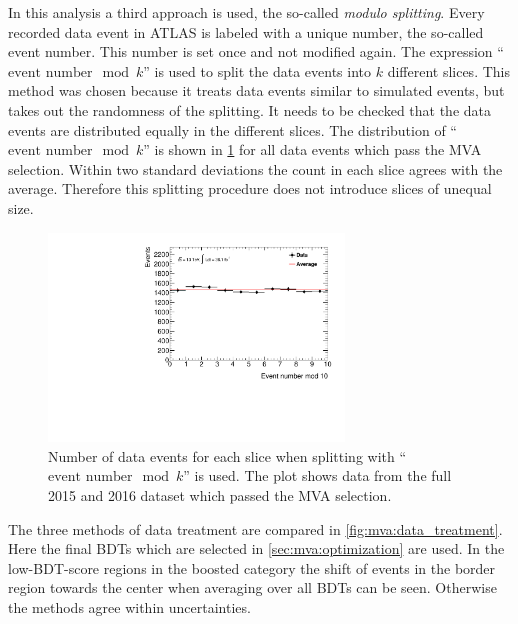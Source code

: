 In this analysis a third approach is used, the so-called \emph{modulo splitting}.
Every recorded data event in ATLAS is labeled with a unique number, the so-called event number.
This number is set once and not modified again.
The expression ``$\text{event number} \mod k$'' is used to split the data events into $k$ different slices.
This method was chosen because it treats data events similar to simulated events, but takes out the randomness of the splitting.
It needs to be checked that the data events are distributed equally in the different slices.
The distribution of ``$\text{event number} \mod k$'' is shown in \cref{fig:mva:event_number_mod} for all
data events which pass the MVA selection.
Within two standard deviations the count in each slice agrees with the average.
Therefore this splitting procedure does not introduce slices of unequal size.

\begin{figure}[htb]
    \centering
    \includegraphics[width=0.7\textwidth]{./plots/mva/data_treatment/event_number_mod.pdf}
    \caption{Number of data events for each slice when splitting with ``$\text{event number} \mod k$'' is used.
             The plot shows data from the full 2015 and 2016 dataset which passed the MVA selection.}\label{fig:mva:event_number_mod}
\end{figure}

The three methods of data treatment are compared in \cref{fig:mva:data_treatment}.
Here the final BDTs which are selected in \cref{sec:mva:optimization} are used.
In the low-BDT-score regions in the boosted category the shift of events in the border region towards
the center when averaging over all BDTs can be seen.
Otherwise the methods agree within uncertainties.

